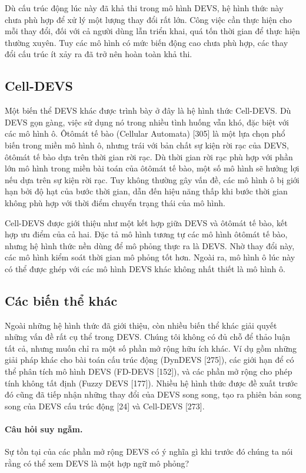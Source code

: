 Dù cấu trúc động lúc này đã khả thi trong mô hình DEVS, hệ hình thức này chưa phù hợp để xử lý một lượng thay đổi rất lớn. Công việc cần thực hiện cho mỗi thay đổi, đối với cả người dùng lẫn triển khai, quá tốn thời gian để thực hiện thường xuyên. Tuy các mô hình có mức biến động cao chưa phù hợp, các thay đổi cấu trúc ít xảy ra đã trở nên hoàn toàn khả thi.

\subsection{Cell-DEVS}
Một biến thể DEVS khác được trình bày ở đây là hệ hình thức Cell-DEVS. Dù DEVS gọn gàng, việc sử dụng nó trong nhiều tình huống vẫn khó, đặc biệt với các mô hình ô. Ôtômát tế bào (Cellular Automata) [305] là một lựa chọn phổ biến trong miền mô hình ô, nhưng trái với bản chất sự kiện rời rạc của DEVS, ôtômát tế bào dựa trên thời gian rời rạc. Dù thời gian rời rạc phù hợp với phần lớn mô hình trong miền bài toán của ôtômát tế bào, một số mô hình sẽ hưởng lợi nếu dựa trên sự kiện rời rạc. Tuy không thường gây vấn đề, các mô hình ô bị giới hạn bởi độ hạt của bước thời gian, dẫn đến hiệu năng thấp khi bước thời gian không phù hợp với thời điểm chuyển trạng thái của mô hình.

Cell-DEVS được giới thiệu như một kết hợp giữa DEVS và ôtômát tế bào, kết hợp ưu điểm của cả hai. Đặc tả mô hình tương tự các mô hình ôtômát tế bào, nhưng hệ hình thức nền dùng để mô phỏng thực ra là DEVS. Nhờ thay đổi này, các mô hình kiểm soát thời gian mô phỏng tốt hơn. Ngoài ra, mô hình ô lúc này có thể được ghép với các mô hình DEVS khác không nhất thiết là mô hình ô.

\subsection{Các biến thể khác}
Ngoài những hệ hình thức đã giới thiệu, còn nhiều biến thể khác giải quyết những vấn đề rất cụ thể trong DEVS. Chúng tôi không có đủ chỗ để thảo luận tất cả, nhưng muốn chỉ ra một số phần mở rộng hữu ích khác. Ví dụ gồm những giải pháp khác cho bài toán cấu trúc động (DynDEVS [275]), các giới hạn để có thể phân tích mô hình DEVS (FD-DEVS [152]), và các phần mở rộng cho phép tính không tất định (Fuzzy DEVS [177]). Nhiều hệ hình thức được đề xuất trước đó cũng đã tiếp nhận những thay đổi của DEVS song song, tạo ra phiên bản song song của DEVS cấu trúc động [24] và Cell-DEVS [273].

\paragraph{Câu hỏi suy ngẫm.} Sự tồn tại của các phần mở rộng DEVS có ý nghĩa gì khi trước đó chúng ta nói rằng có thể xem DEVS là một hợp ngữ mô phỏng?

